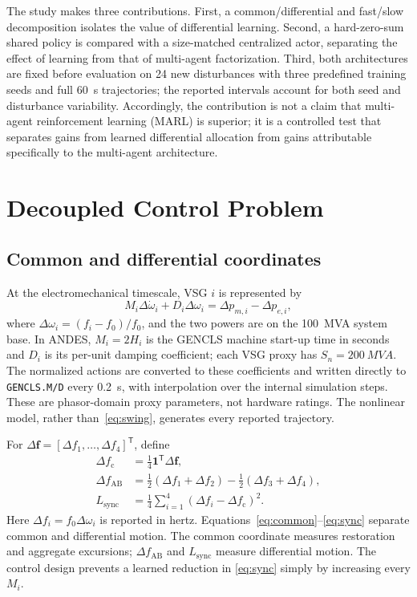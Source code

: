 \documentclass[conference,a4paper]{IEEEtran}
\begin{document}
The study makes three contributions. First, a common/differential and fast/slow
decomposition isolates the value of differential learning. Second, a
hard-zero-sum shared policy is compared with a size-matched centralized actor,
separating the effect of learning from that of multi-agent factorization.
Third, both architectures are fixed before evaluation on 24 new disturbances
with three predefined training seeds and full \SI{60}{s} trajectories; the
reported intervals account for both seed and disturbance variability.
Accordingly, the contribution is not a claim that multi-agent reinforcement
learning (MARL) is superior; it is a controlled test that separates gains from
learned differential allocation from gains attributable specifically to the
multi-agent architecture.

\section{Decoupled Control Problem}

\subsection{Common and differential coordinates}

At the electromechanical timescale, VSG \(i\) is represented by
\begin{equation}
 M_i\Delta\dot\omega_i+D_i\Delta\omega_i
 =\Delta p_{m,i}-\Delta p_{e,i},
\label{eq:swing}
\end{equation}
where \(\Delta\omega_i=(f_i-f_0)/f_0\), and the two powers are on the
\SI{100}{MVA} system base. In ANDES, \(M_i=2H_i\) is the GENCLS machine
start-up time in seconds and \(D_i\) is its per-unit damping coefficient; each
VSG proxy has \(S_n=\SI{200}{MVA}\). The normalized actions are converted to
these coefficients and written directly to \texttt{GENCLS.M/D} every
\SI{0.2}{s}, with interpolation over the internal simulation steps. These are
phasor-domain proxy parameters, not hardware ratings. The nonlinear model,
rather than~\eqref{eq:swing}, generates every reported trajectory.

For \(\Delta\mathbf f=[\Delta f_1,\ldots,\Delta f_4]^\mathsf T\), define
\begin{align}
 \Delta f_{\mathrm c}
 &=\tfrac14\mathbf1^\mathsf T\Delta\mathbf f, \label{eq:common}\\
 \Delta f_{\mathrm{AB}}
 &=\tfrac12(\Delta f_1+\Delta f_2)
  -\tfrac12(\Delta f_3+\Delta f_4), \label{eq:area}\\
 L_{\mathrm{sync}}
 &=\tfrac14\sum_{i=1}^{4}
   (\Delta f_i-\Delta f_{\mathrm c})^2 . \label{eq:sync}
\end{align}
Here \(\Delta f_i=f_0\Delta\omega_i\) is reported in hertz.
Equations~\eqref{eq:common}--\eqref{eq:sync} separate common and differential
motion. The common coordinate measures restoration and aggregate excursions;
\(\Delta f_{\mathrm{AB}}\) and \(L_{\mathrm{sync}}\) measure differential
motion. The control design prevents a learned reduction in
\eqref{eq:sync} simply by increasing every \(M_i\).
\end{document}
